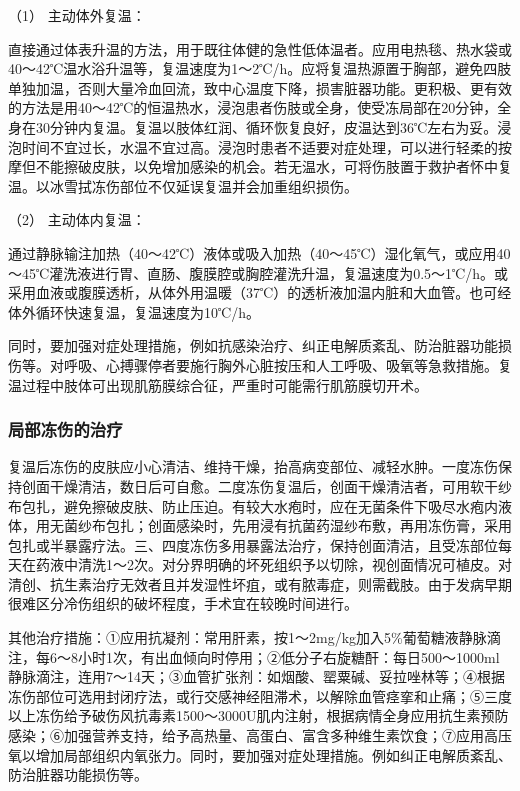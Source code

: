 \hypertarget{text00358.htmlux5cux23CHP15-3-3-1-2-1}{}
（1） 主动体外复温：

直接通过体表升温的方法，用于既往体健的急性低体温者。应用电热毯、热水袋或40～42℃温水浴升温等，复温速度为1～2℃/h。应将复温热源置于胸部，避免四肢单独加温，否则大量冷血回流，致中心温度下降，损害脏器功能。更积极、更有效的方法是用40～42℃的恒温热水，浸泡患者伤肢或全身，使受冻局部在20分钟，全身在30分钟内复温。复温以肢体红润、循环恢复良好，皮温达到36℃左右为妥。浸泡时间不宜过长，水温不宜过高。浸泡时患者不适要对症处理，可以进行轻柔的按摩但不能擦破皮肤，以免增加感染的机会。若无温水，可将伤肢置于救护者怀中复温。以冰雪拭冻伤部位不仅延误复温并会加重组织损伤。

\hypertarget{text00358.htmlux5cux23CHP15-3-3-1-2-2}{}
（2） 主动体内复温：

通过静脉输注加热（40～42℃）液体或吸入加热（40～45℃）湿化氧气，或应用40～45℃灌洗液进行胃、直肠、腹膜腔或胸腔灌洗升温，复温速度为0.5～1℃/h。或采用血液或腹膜透析，从体外用温暖（37℃）的透析液加温内脏和大血管。也可经体外循环快速复温，复温速度为10℃/h。

同时，要加强对症处理措施，例如抗感染治疗、纠正电解质紊乱、防治脏器功能损伤等。对呼吸、心搏骤停者要施行胸外心脏按压和人工呼吸、吸氧等急救措施。复温过程中肢体可出现肌筋膜综合征，严重时可能需行肌筋膜切开术。

\subsubsection{局部冻伤的治疗}

复温后冻伤的皮肤应小心清洁、维持干燥，抬高病变部位、减轻水肿。一度冻伤保持创面干燥清洁，数日后可自愈。二度冻伤复温后，创面干燥清洁者，可用软干纱布包扎，避免擦破皮肤、防止压迫。有较大水疱时，应在无菌条件下吸尽水疱内液体，用无菌纱布包扎；创面感染时，先用浸有抗菌药湿纱布敷，再用冻伤膏，采用包扎或半暴露疗法。三、四度冻伤多用暴露法治疗，保持创面清洁，且受冻部位每天在药液中清洗1～2次。对分界明确的坏死组织予以切除，视创面情况可植皮。对清创、抗生素治疗无效者且并发湿性坏疽，或有脓毒症，则需截肢。由于发病早期很难区分冷伤组织的破坏程度，手术宜在较晚时间进行。

其他治疗措施：①应用抗凝剂：常用肝素，按1～2mg/kg加入5\%葡萄糖液静脉滴注，每6～8小时1次，有出血倾向时停用；②低分子右旋糖酐：每日500～1000ml静脉滴注，连用7～14天；③血管扩张剂：如烟酸、罂粟碱、妥拉唑林等；④根据冻伤部位可选用封闭疗法，或行交感神经阻滞术，以解除血管痉挛和止痛；⑤三度以上冻伤给予破伤风抗毒素1500～3000U肌内注射，根据病情全身应用抗生素预防感染；⑥加强营养支持，给予高热量、高蛋白、富含多种维生素饮食；⑦应用高压氧以增加局部组织内氧张力。同时，要加强对症处理措施。例如纠正电解质紊乱、防治脏器功能损伤等。


